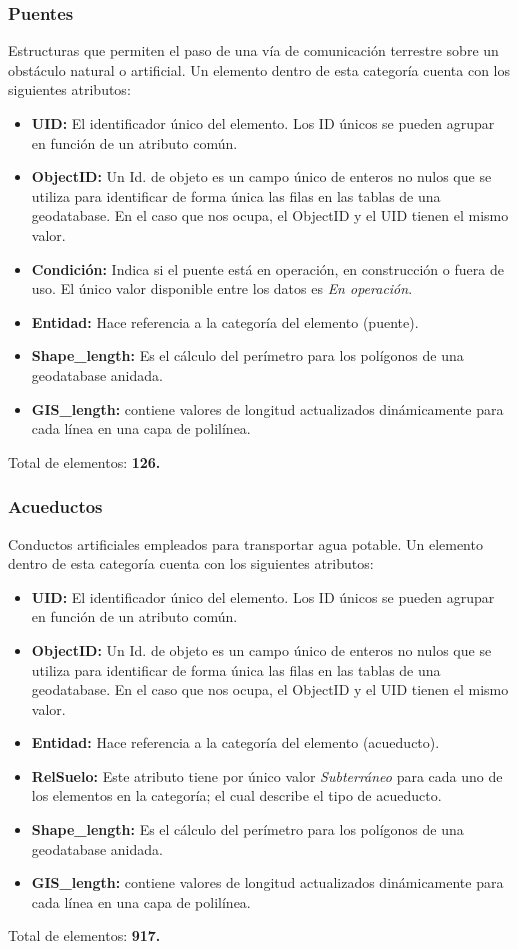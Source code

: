 \documentclass[10pt,letterpaper]{article}
\newcommand{\descripcion}{Un elemento dentro de esta categor\'ia cuenta con los siguientes atributos:}
\newcommand{\total}{Total de elementos: }
\newcommand{\UID}{\textbf{UID:} El identificador \'unico del elemento. Los ID \'unicos se pueden agrupar en funci\'on de un atributo com\'un.}
\newcommand{\OID}{\textbf{ObjectID:} Un Id. de objeto es un campo \'unico de enteros no nulos que se utiliza para identificar de forma \'unica las filas en las tablas de una geodatabase. En el caso que nos ocupa, el ObjectID y el UID tienen el mismo valor.}
\newcommand{\ent}{\textbf{Entidad:} Hace referencia a la categor\'ia del elemento }
\newcommand{\SHL}{\textbf{Shape\_length:} Es el c\'alculo del per\'imetro para los pol\'igonos de una geodatabase anidada.}
\newcommand{\GISL}{\textbf{GIS\_length:} contiene valores de longitud actualizados din\'amicamente para cada l\'inea en una capa de polil\'inea.}
\begin{document}
\subsubsection{Puentes}
Estructuras que permiten el paso de una v\'ia de comunicaci\'on terrestre sobre un obst\'aculo natural o artificial. \descripcion
\begin{itemize}
	\item \UID
	\item \OID
	\item \textbf{Condici\'on:} Indica si el puente est\'a en operaci\'on, en construcci\'on o fuera de uso. El \'unico valor disponible entre los datos es \emph{En operaci\'on}.
	\item \ent (puente).
	\item \SHL
	\item \GISL
\end{itemize}
\total \textbf{126.}

\subsubsection{Acueductos}
Conductos artificiales empleados para transportar agua potable. \descripcion
\begin{itemize}
	\item \UID
	\item \OID
	\item \ent (acueducto).
	\item \textbf{RelSuelo:} Este atributo tiene por \'unico valor \emph{Subterr\'aneo} para cada uno de los elementos en la categor\'ia; el cual describe el tipo de acueducto.
	\item \SHL
	\item \GISL
\end{itemize}
\total \textbf{917.}
\end{document}
